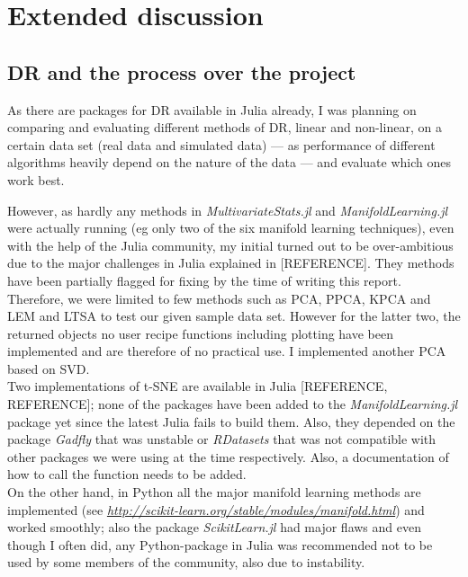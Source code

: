 \documentclass[journal, a4paper]{IEEEtran}
\begin{document}

\section{Extended discussion}

\subsection{DR and the process over the project}\label{discussion}

As there are packages for DR available in Julia already, I was planning on comparing and evaluating different methods of DR, linear and non-linear, on a certain data set (real data and simulated data) — as performance of different algorithms heavily depend on the nature of the data — and evaluate which ones work best. 

However, as hardly any methods in \textit{MultivariateStats.jl} and \textit{ManifoldLearning.jl} were actually running (eg only two of the six manifold learning techniques), even with the help of the Julia community, my initial turned out to be over-ambitious due to the major challenges in Julia explained in [REFERENCE]. 
They methods have been partially flagged for fixing by the time of writing this report. Therefore, we were limited to few methods such as PCA, PPCA, KPCA and LEM and LTSA to test our given sample data set. However for the latter two, the returned objects no user recipe functions including plotting have been implemented and are therefore of no practical use. I implemented another PCA based on SVD. \\


Two implementations of t-SNE are available in Julia [REFERENCE, REFERENCE]; none of the packages have been added to the \textit{ManifoldLearning.jl} package yet since the latest Julia fails to build them. Also, they depended on the package \textit{Gadfly} that was unstable or \textit{RDatasets} that was not compatible with other packages we were using at the time respectively. Also, a documentation of how to call the function needs to be added. \\

On the other hand, in Python all the major manifold learning methods are implemented (see \textit{\url{http://scikit-learn.org/stable/modules/manifold.html}}) and worked smoothly; also the package \textit{ScikitLearn.jl} had major flaws and even though I often did, any Python-package in Julia was recommended not to be used by some members of the community, also due to instability. \\
\end{document}
